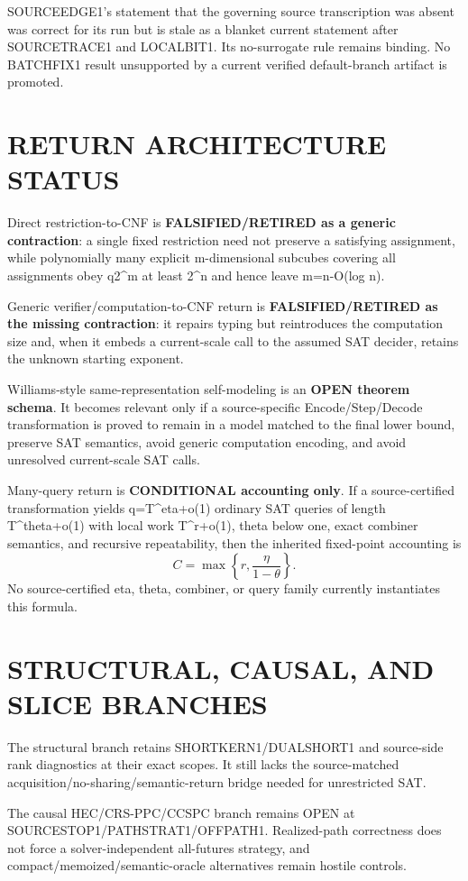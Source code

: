 \documentclass[11pt]{article}
\begin{document}
SOURCEEDGE1's statement that the governing source transcription was absent was correct for its run but is stale as a blanket current statement after SOURCETRACE1 and LOCALBIT1. Its no-surrogate rule remains binding. No BATCHFIX1 result unsupported by a current verified default-branch artifact is promoted.

\section*{RETURN ARCHITECTURE STATUS}
Direct restriction-to-CNF is \textbf{FALSIFIED/RETIRED as a generic contraction}: a single fixed restriction need not preserve a satisfying assignment, while polynomially many explicit m-dimensional subcubes covering all assignments obey q2^m at least 2^n and hence leave m=n-O(log n).

Generic verifier/computation-to-CNF return is \textbf{FALSIFIED/RETIRED as the missing contraction}: it repairs typing but reintroduces the computation size and, when it embeds a current-scale call to the assumed SAT decider, retains the unknown starting exponent.

Williams-style same-representation self-modeling is an \textbf{OPEN theorem schema}. It becomes relevant only if a source-specific Encode/Step/Decode transformation is proved to remain in a model matched to the final lower bound, preserve SAT semantics, avoid generic computation encoding, and avoid unresolved current-scale SAT calls.

Many-query return is \textbf{CONDITIONAL accounting only}. If a source-certified transformation yields q=T^{eta+o(1)} ordinary SAT queries of length T^{theta+o(1)} with local work T^{r+o(1)}, theta below one, exact combiner semantics, and recursive repeatability, then the inherited fixed-point accounting is
\[
C=\max\left\{r,\frac{\eta}{1-\theta}\right\}.
\]
No source-certified eta, theta, combiner, or query family currently instantiates this formula.

\section*{STRUCTURAL, CAUSAL, AND SLICE BRANCHES}
The structural branch retains SHORTKERN1/DUALSHORT1 and source-side rank diagnostics at their exact scopes. It still lacks the source-matched acquisition/no-sharing/semantic-return bridge needed for unrestricted SAT.

The causal HEC/CRS-PPC/CCSPC branch remains OPEN at SOURCESTOP1/PATHSTRAT1/OFFPATH1. Realized-path correctness does not force a solver-independent all-futures strategy, and compact/memoized/semantic-oracle alternatives remain hostile controls.
\end{document}
